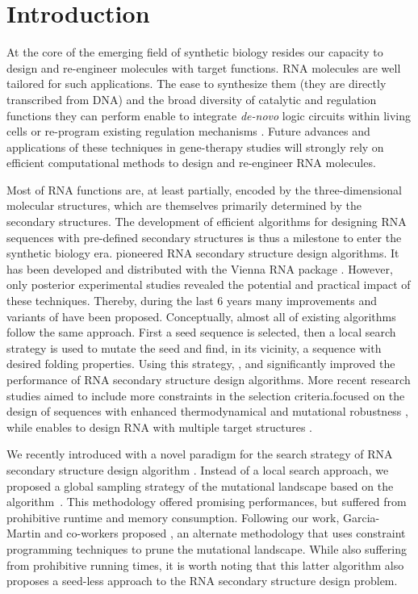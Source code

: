 \section{Introduction}
\label{sec:introduction}

At the core of the emerging field of synthetic biology resides our capacity to design and re-engineer molecules with target functions. RNA molecules are well tailored for such applications. The ease to synthesize them (they are directly transcribed from DNA) and the broad diversity of catalytic and regulation functions they can perform enable to integrate \textit{de-novo} logic  circuits within living cells \cite{Rodrigo:2012fk} or re-program existing regulation mechanisms \cite{Chang:2012uq}. Future advances and applications of these techniques in gene-therapy studies will strongly rely on efficient computational methods to design and re-engineer RNA molecules.

Most of RNA functions are, at least partially, encoded by the three-dimensional molecular structures, which are themselves primarily determined by the secondary structures. The development of efficient algorithms for designing RNA sequences with pre-defined secondary structures is thus a milestone to enter the synthetic biology era. \RNAinverse pioneered RNA secondary structure design algorithms. It has been developed and distributed with the Vienna RNA package \cite{Hofacker:1994}. However, only posterior experimental studies revealed the potential and practical impact of these techniques. Thereby, during the last 6 years many improvements and variants of \RNAinverse have been proposed. Conceptually, almost all of existing algorithms follow the same approach. First a seed sequence is selected, then a local search strategy is used to mutate the seed and find, in its vicinity, a sequence with desired folding properties. Using this strategy, \INFORNA \cite{Busch:2006uq}, \RNASSD \cite{Aguirre-Hernandez:2007kx} and \NUPACK \cite{Zadeh:2011fk} significantly improved the performance of RNA secondary structure design algorithms. More recent research studies aimed to include more constraints in the selection criteria.\RNAexinv focused on the design of sequences with enhanced thermodynamical and mutational robustness \cite{Avihoo:2011fk}, while \frankenstein enables to design RNA with multiple target structures \cite{Lyngso:2012vn}.

We recently introduced with \RNAensign a novel paradigm for the search strategy of RNA secondary structure design algorithm \cite{Levin:2012kx}. Instead of a local search approach, we proposed a global sampling strategy of the mutational landscape based on the \RNAmutants algorithm~\cite{Waldispuhl2008}. This methodology offered promising performances, but suffered from  prohibitive runtime and memory consumption. Following our work, Garcia-Martin and co-workers proposed \RNAiFOLD, an alternate methodology that uses constraint programming techniques to prune the mutational landscape. While also suffering from prohibitive running times, it is worth noting that this latter algorithm also proposes a seed-less approach to the RNA secondary structure design problem.

